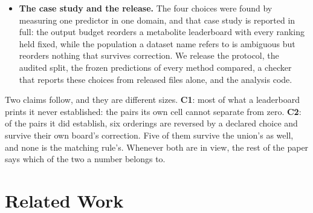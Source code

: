 \documentclass{article}
\begin{document}
\begin{itemize}
  substrates under two conventions, both defensible and both correct arithmetic. Its curated fifth
  reaches $0.487$ against the mined majority's $0.800$ as deployed, and $0.668$ against $0.332$ with
  hydrogens expanded. The gap is $+0.313$ one way and $-0.336$ the other, and the validity floor
  carries $0.000$ of it. The convention does not move the number; it exchanges which half of the
  bank carries it. The hazard is not confined to this domain. All
  $42{,}554$ patterns in the standard retrosynthesis template library pin a connection count.
  Expanding hydrogens costs that library $82\%$ of the template--product pairs it can match, though
  only $11$ of $500$ products lose every applicable template.
\item \textbf{The case study and the release.} The four choices were found by measuring one
  predictor in one domain, and that case study is reported in full: the output budget reorders a
  metabolite leaderboard with every ranking held fixed, while the population a dataset name refers
  to is ambiguous but reorders nothing that survives correction. We release the
  protocol, the audited split, the frozen predictions of every method compared, a checker that
  reports these choices from released files alone, and the analysis code.
\end{itemize}

Two claims follow, and they are different sizes. \textbf{C1}: most of what a leaderboard prints it
never established: the pairs its own cell cannot separate from zero. \textbf{C2}: of the pairs it
did establish, six orderings are reversed by a declared choice and survive their own board's
correction. Five of them survive the union's as well, and none is the matching rule's. Whenever both
are in view, the rest of the paper says which of the two a number belongs to.
\section{Related Work}
\label{sec:related}
\end{document}
